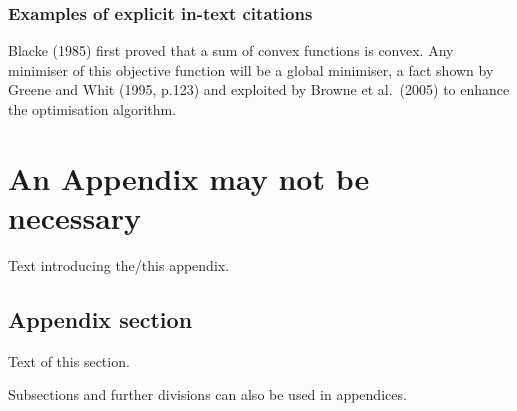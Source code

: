 \documentclass[a4paper, 12pt, notitlepage]{report}
\begin{document}
\subsection{Examples of explicit in-text citations}
%
Blacke (1985) first proved that a sum of convex functions is convex. Any minimiser of this objective function will be a global minimiser, a fact shown by Greene and Whit (1995, p.123) and exploited by Browne et al.\ (2005) to enhance the optimisation algorithm.

\appendix
\chapter{An Appendix may not be necessary}
%
Text introducing the/this appendix.

\section{Appendix section}
%
Text of this section.

Subsections and further divisions can also be used in appendices.

%

%
\end{document}

